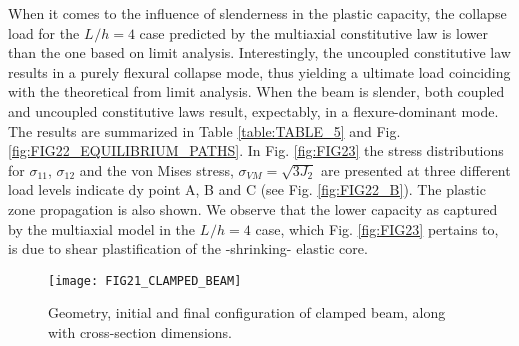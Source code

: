 When it comes to the influence of slenderness in the plastic capacity, the 
collapse 
load for the $L^{}/h=4$ case predicted by the multiaxial constitutive law is 
lower than the one based on limit analysis. Interestingly, the uncoupled 
constitutive law results in a purely flexural collapse mode, thus yielding a 
ultimate load coinciding with the theoretical from limit analysis. When the 
beam is slender, both coupled and uncoupled constitutive laws result, 
expectably, in a flexure-dominant mode. The results are summarized in Table 
\ref{table:TABLE_5} and Fig. \ref{fig:FIG22_EQUILIBRIUM_PATHS}. In Fig. 
\ref{fig:FIG23} the stress distributions for $\sigma_{11}$, $\sigma_{12}$ and 
the von Mises stress, $\sigma_{VM}=\sqrt{3J_2}$ are presented at three 
different load levels indicate dy point A, B and C (see Fig. 
\ref{fig:FIG22_B}). 
The plastic zone propagation is also shown. We observe that the lower 
capacity as captured by the multiaxial model in the $L^{}/h=4$ case, which Fig. 
\ref{fig:FIG23} pertains to, is due to shear plastification of the -shrinking- 
elastic core.

\begin{figure}
	\centering
	\texttt{[image: FIG21\_CLAMPED\_BEAM]}
	\caption{Geometry, initial and final configuration of clamped beam, along 
		with cross-section dimensions.}
	\label{fig:FIG21_CLAMPED_BEAM}
\end{figure}

\noindent{}

